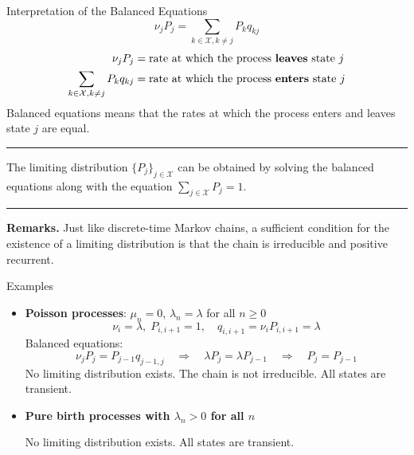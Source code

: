 \documentclass[letterpaper,handout]{beamer}
\def\X{\mathcal{X}}
\begin{document}
\begin{frame}{Interpretation of the Balanced Equations}
$$\nu_jP_j= \sum_{k\in\X,k\neq j}P_k q_{kj}$$
\begin{align*}
\nu_jP_j &= \mbox{rate at which the process {\bf leaves} state } j\\
\sum_{k\in\X,k\neq j}P_{k}q_{kj} &= \mbox{rate at which the process {\bf enters} state }j
\end{align*}
Balanced equations means that the rates at which the
process enters and leaves state $j$ are equal.\medskip

\hrule\medskip

The limiting distribution $\{P_j\}_{j\in\X}$ can be obtained by solving the balanced equations
along with the equation $\sum_{j\in\X}P_j=1$.\medskip

\hrule\medskip
\textbf{Remarks.}
Just like discrete-time Markov chains, a sufficient condition for the existence of a limiting distribution is that
the chain is irreducible and positive recurrent.
\end{frame}
\begin{frame}{Examples}
\begin{itemize}[<+->]
\item {\bf Poisson processes}: $\mu_n=0$, $\lambda_n=\lambda$ for all $n\ge 0$
$$\nu_i=\lambda,\;P_{i,i+1}=1,\quad q_{i,i+1}=\nu_iP_{i,i+1}=\lambda$$
Balanced equations:
$$\nu_jP_j= P_{j-1}q_{j-1,j}\quad\Rightarrow\quad \lambda P_j=\lambda P_{j-1}
\quad\Rightarrow\quad P_j=P_{j-1}$$
No limiting distribution exists. The chain is not irreducible. All states are transient.

\item {\bf Pure birth processes with $\lambda_n>0$ for all $n$}

No limiting distribution exists. All states are transient.

\end{itemize}
\end{frame}
\end{document}
